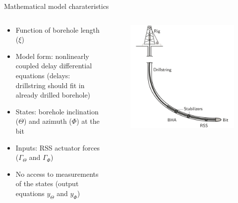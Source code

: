 \documentclass[10pt]{beamer}
\begin{document}
\begin{frame}{Mathematical model charateristics}
\begin{columns}
\begin{column}{0.5\textwidth}
	\begin{itemize}\setlength\itemsep{1em}
	\item Function of borehole length ($\xi$)
	\item Model form: nonlinearly coupled delay differential equations (delays: drillstring should fit in already drilled borehole)
	\item States: borehole inclination ($\Theta$) and azimuth ($\Phi$) at the bit
	\item Inputs: RSS actuator forces ($\Gamma_\Theta$ and $\Gamma_\Phi$)
	\item No access to measurements of the states (output equations $y_\Theta$ and $y_\Phi$)
	\end{itemize}
\end{column}
	\begin{column}{0.4\textwidth}
	\begin{figure}[ht]\centering
		\includegraphics[width=1.25\textwidth]{images/drillingsystem.pdf}
	\end{figure}
	\end{column}
\end{columns}
\end{frame}
\end{document}
